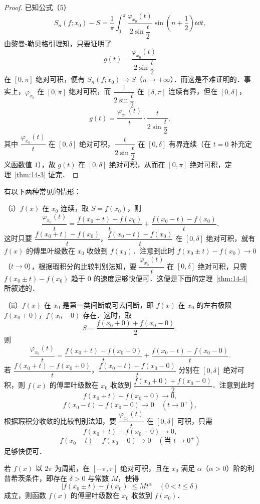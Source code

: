 \begin{proof}
已知公式（5）
\[
S_{n}(f;x_{0})-S=\frac{1}{\pi}\int_{0}^{\pi}\frac{\varphi_{x_{0}}(t)}{2\sin\dfrac{t}{2}}\sin\left(n+\frac{1}{2}\right)t\dd t,
\]
由黎曼-勒贝格引理知，只要证明了
\[
g(t)=\frac{\varphi_{x_{0}}(t)}{2\sin\dfrac{t}{2}}
\]
在 $[0,\pi]$ 绝对可积，便有 $S_{n}(f;x_{0})\to S$（$n\to+\infty$）．而这是不难证明的．事实上，$\varphi_{x_{0}}$ 在 $[0,\pi]$ 绝对可积，而 $\dfrac{1}{2\sin\dfrac{t}{2}}$ 在 $[\delta,\pi]$ 连续有界，但在 $[0,\delta]$，
\[
g(t)=\frac{\varphi_{x_{0}}(t)}{t}\cdot\frac{t}{2\sin\dfrac{t}{2}},
\]
其中 $\dfrac{\varphi_{x_{0}}(t)}{t}$ 在 $[0,\delta]$ 绝对可积，$\dfrac{t}{2\sin\dfrac{t}{2}}$ 在 $[0,\delta]$ 有界连续（在 $t=0$ 补充定义函数值 $1$），故 $g(t)$ 在 $[0,\delta]$ 绝对可积，从而在 $[0,\pi]$ 绝对可积，定理~\ref{thm:14-3} 证完．
\end{proof}

有以下两种常见的情形：

（i）$f(x)$ 在 $x_{0}$ 连续，取 $S=f(x_{0})$，则
\[
\frac{\varphi_{x_{0}}(t)}{t}=\frac{f(x_{0}+t)-f(x_{0})}{t}+\frac{f(x_{0}-t)-f(x_{0})}{t}.
\]
这时只要 $\dfrac{f(x_{0}+t)-f(x_{0})}{t}$，$\dfrac{f(x_{0}-t)-f(x_{0})}{t}$ 在 $[0,\delta]$ 绝对可积，就有 $f(x)$ 的傅里叶级数在 $x_{0}$ 收敛到 $f(x_{0})$．注意到此时 $f(x_{0}\pm t)-f(x_{0})\to 0$（$t\to 0$），根据瑕积分的比较判别法知，要 $\dfrac{\varphi_{x_{0}}(t)}{t}$ 在 $[0,\delta]$ 绝对可积，只需 $f(x_{0}\pm t)-f(x_{0})$ 趋于 $0$ 的速度足够快便可．这便是下面的定理~\ref{thm:14-4} 所叙述的．

（ii）$f(x)$ 在 $x_{0}$ 是第一类间断或可去间断，即 $f(x)$ 在 $x_{0}$ 的左右极限 $f(x_{0}+0)$，$f(x_{0}-0)$ 存在．这时，取
\[
S=\frac{f(x_{0}+0)+f(x_{0}-0)}{2},
\]
则
\[
\frac{\varphi_{x_{0}}(t)}{t}=\frac{f(x_{0}+t)-f(x_{0}+0)}{t}+\frac{f(x_{0}-t)-f(x_{0}-0)}{t}.
\]
若 $\dfrac{f(x_{0}+t)-f(x_{0}+0)}{t}$，$\dfrac{f(x_{0}-t)-f(x_{0}-0)}{t}$ 分别在 $[0,\delta]$ 绝对可积，则 $f(x)$ 的傅里叶级数在 $x_{0}$ 收敛到 $\dfrac{f(x_{0}+0)+f(x_{0}-0)}{2}$．注意到此时
\[
f(x_{0}+t)-f(x_{0}+0)\to 0,
\]
\[
f(x_{0}-t)-f(x_{0}-0)\to 0\quad(t\to 0^{+}),
\]
根据瑕积分收敛的比较判别法知，要 $\dfrac{\varphi_{x_{0}}(t)}{t}$ 在 $[0,\delta]$ 可积，只需
\[
f(x_{0}+t)-f(x_{0}+0)\to 0,
\]
\[
f(x_{0}-t)-f(x_{0}-0)\to 0\quad(\text{当 }t\to 0^{+})
\]
足够快便可．

\begin{theorem}\label{thm:14-4}
若 $f(x)$ 以 $2\pi$ 为周期，在 $[-\pi,\pi]$ 绝对可积，且在 $x_{0}$ 满足 $\alpha$（$\alpha>0$）阶的利普希茨条件，即存在 $\delta>0$ 与常数 $M$，使得
\[
\left|f(x_{0}\pm t)-f(x_{0})\right|\leqslant Mt^{\alpha}\quad(0<t\leqslant\delta)
\]
成立，则函数 $f(x)$ 的傅里叶级数在 $x_{0}$ 收敛到 $f(x_{0})$．
\end{theorem}

